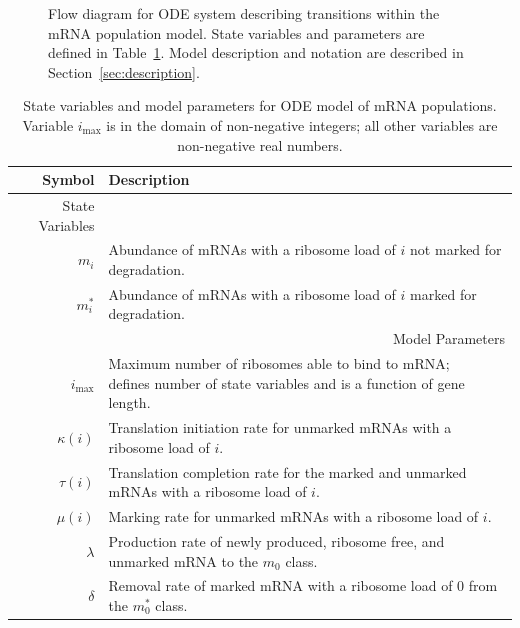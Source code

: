 \documentclass[review]{elsarticle}
\newcommand{\imax}{\ensuremath{i_{\max}}\xspace}
\begin{document}
\begin{figure} [htbp]
\begin{framed}
\begin{tikzpicture}[every node/.style={rectangle,fill=white,node distance=16ex, scale=0.75}, scale=0.90]
	\end{tikzpicture}
	\caption{Flow diagram for ODE system describing transitions within the mRNA population model.
State variables and parameters are defined in Table~\ref{tab:params}.
Model description and notation are described in Section~\ref{sec:description}.}
	\label{fig:flow_diagram}
	\end{framed}
\end{figure}

\begin{table}
\centering
\begin{tabular}{|rp{4in}|}\hline
\textbf{Symbol}&\textbf{Description}\\ \hline\hline
State Variables & \\ \hline
$m_i$ & Abundance of mRNAs with a ribosome load of $i$ not marked for degradation. \\
$m_i^*$ & Abundance of mRNAs with a ribosome load of $i$ marked for degradation. \\ \hline
\multicolumn{2}{r}{Model Parameters} \\ \hline
  \imax & \shortstack{Maximum number of ribosomes able to bind to mRNA;\\
           defines number of state variables and is a function of gene length.} \\
$\kappa(i)$ & Translation initiation rate for unmarked mRNAs with a ribosome load of $i$.\\
$\tau(i)$ & Translation completion rate for the marked and unmarked mRNAs with a ribosome load of $i$. \\
$\mu(i)$ & Marking rate for unmarked mRNAs with a ribosome load of $i$.\\
$\lambda$ & Production rate of newly produced, ribosome free, and unmarked mRNA to the $m_0$ class.\\
$\delta$ & Removal rate of marked mRNA with a ribosome load of 0 from the $m_0^*$ class.\\ \hline \hline
\end{tabular}
\caption{State variables and model parameters for ODE model of mRNA populations.
Variable \imax is in the domain of non-negative integers; all other variables are non-negative real numbers.}
\label{tab:params}
\end{table}
\end{document}
